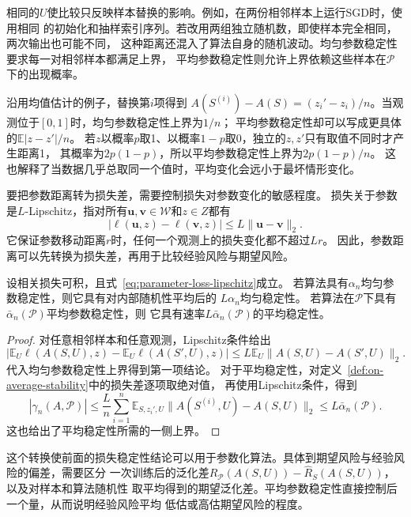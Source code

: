 相同的$U$使比较只反映样本替换的影响。例如，在两份相邻样本上运行SGD时，使用相同
的初始化和抽样索引序列。若改用两组独立随机数，即使样本完全相同，两次输出也可能不同，
这种距离还混入了算法自身的随机波动。均匀参数稳定性要求每一对相邻样本都满足上界，
平均参数稳定性则允许上界依赖这些样本在$\mathcal P$下的出现概率。

沿用均值估计的例子，替换第$i$项得到
$A(S^{(i)})-A(S)=(z_i'-z_i)/n$。当观测位于$[0,1]$时，均匀参数稳定性上界为$1/n$；
平均参数稳定性却可以写成更具体的$\mathbb E|z-z'|/n$。
若$z$以概率$p$取1、以概率$1-p$取0，独立的$z,z'$只有取值不同时才产生距离1，
其概率为$2p(1-p)$，所以平均参数稳定性上界为$2p(1-p)/n$。
这也解释了当数据几乎总取同一个值时，平均变化会远小于最坏情形变化。

要把参数距离转为损失差，需要控制损失对参数变化的敏感程度。
损失关于参数是$L$-Lipschitz，指对所有$\bm u,\bm v\in\mathcal W$和$z\in Z$都有
\begin{equation}
 |\ell(\bm u,z)-\ell(\bm v,z)|\leq L\|\bm u-\bm v\|_2.
 \label{eq:parameter-loss-lipschitz}
\end{equation}
它保证参数移动距离$r$时，任何一个观测上的损失变化都不超过$Lr$。
因此，参数距离可以先转换为损失差，再用于比较经验风险与期望风险。

\begin{theorem}[参数稳定性与损失稳定性]
\label{thm:parameter-to-loss-stability}
设相关损失可积，且式~\eqref{eq:parameter-loss-lipschitz}成立。
若算法具有$\alpha_n$均匀参数稳定性，则它具有对内部随机性平均后的
$L\alpha_n$均匀稳定性。
若算法在$\mathcal P$下具有$\bar\alpha_n(\mathcal P)$平均参数稳定性，则
它具有速率$L\bar\alpha_n(\mathcal P)$的平均稳定性。
\end{theorem}
\begin{proof}
对任意相邻样本和任意观测，Lipschitz条件给出
\[
 \left|\mathbb E_U\ell(A(S,U),z)-\mathbb E_U\ell(A(S',U),z)\right|
 \leq L\mathbb E_U\|A(S,U)-A(S',U)\|_2.
\]
代入均匀参数稳定性上界得到第一项结论。
对于平均稳定性，对定义~\ref{def:on-average-stability}中的损失差逐项取绝对值，
再使用Lipschitz条件，得到
\[
 |\gamma_n(A,\mathcal P)|
 \leq\frac Ln\sum_{i=1}^n\mathbb E_{S,z_i',U}
       \|A(S^{(i)},U)-A(S,U)\|_2
 \leq L\bar\alpha_n(\mathcal P).
\]
这也给出了平均稳定性所需的一侧上界。
\end{proof}

这个转换使前面的损失稳定性结论可以用于参数化算法。具体到期望风险与经验风险的偏差，需要区分
一次训练后的泛化差$R_{\mathcal P}(A(S,U))-\hat R_S(A(S,U))$，以及对样本和算法随机性
取平均得到的期望泛化差。平均参数稳定性直接控制后一个量，从而说明经验风险平均
低估或高估期望风险的程度。

